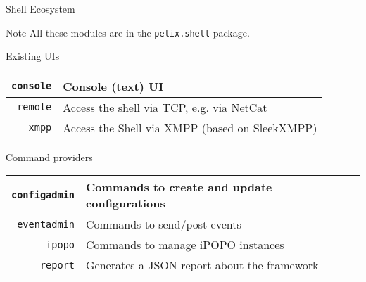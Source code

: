 \begin{frame}{Shell Ecosystem}
\begin{exampleblock}{Note}
All these modules are in the \texttt{pelix.shell} package.
\end{exampleblock}

\begin{block}{Existing UIs}
\centering
\begin{tabular}{rl}
\texttt{console} & Console (text) UI \\
\hline
\texttt{remote} & Access the shell via TCP, e.g. via NetCat \\
\hline
\texttt{xmpp} & Access the Shell via XMPP (based on SleekXMPP) \\
\end{tabular}
\end{block}

\begin{block}{Command providers}
\centering
\begin{tabular}{rl}
\texttt{configadmin} & Commands to create and update configurations \\
\hline
\texttt{eventadmin} & Commands to send/post events \\
\hline
\texttt{ipopo} & Commands to manage iPOPO instances \\
\hline
\texttt{report} & Generates a JSON report about the framework \\
\end{tabular}
\end{block}
\end{frame}
